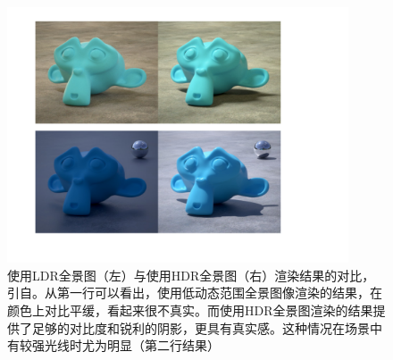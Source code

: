 \begin{figure}[htbp]
    \centering
    \includegraphics[width=0.9\textwidth]{Img/hdr-render.pdf}
    \caption[使用HDR全景图与LDR全景图渲染结果的对比]
    {使用LDR全景图（左）与使用HDR全景图（右）渲染结果的对比，引自\cite{makehdr}。从第一行可以看出，使用低动态范围全景图像渲染的结果，在颜色上对比平缓，看起来很不真实。而使用HDR全景图渲染的结果提供了足够的对比度和锐利的阴影，更具有真实感。这种情况在场景中有较强光线时尤为明显（第二行结果）}
    \label{fig:hdr-render}
\end{figure}